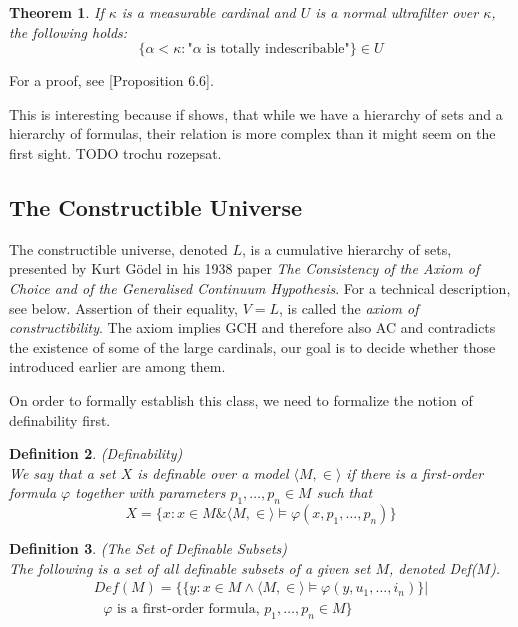 \documentclass[12pt,a4paper]{article}
\newtheorem{theorem}{Theorem}[section]
\newtheorem{definition}[theorem]{Definition}
\newcommand{\et}{\mathrel{\&}}
\begin{document}
\begin{theorem}
If $\kappa$ is a measurable cardinal and $U$ is a normal ultrafilter over $\kappa$, the following holds:
\begin{equation}
\{ \alpha < \kappa: \mbox{"$\alpha$ is totally indescribable"}\} \in U
\end{equation}
\end{theorem}
For a proof, see \cite{KanamoriBook}[Proposition 6.6].

This is interesting because if shows, that while we have a hierarchy of sets and a hierarchy of formulas, their relation is more complex than it might seem on the first sight. 
TODO trochu rozepsat.


\subsection{The Constructible Universe}

The constructible universe, denoted $L$, is a cumulative hierarchy of sets, presented by Kurt Gödel in his 1938 paper \emph{The Consistency of the Axiom of Choice and of the Generalised Continuum Hypothesis}. For a technical description, see below. Assertion of their equality, $V=L$, is called the \emph{axiom of constructibility}. The axiom implies GCH and therefore also AC and contradicts the existence of some of the large cardinals, our goal is to decide whether those introduced earlier are among them.

On order to formally establish this class, we need to formalize the notion of definability first. 
\begin{definition}{(Definability)}\label{def:definability}\\
We say that a set $X$ is \emph{definable} over a model $\langle M, \in \rangle$ if there is a first-order formula $\varphi$ together with parameters $p_1, \ldots, p_n \in M$ such that
\begin{equation}
X = \{x: x \in M \et \langle M, \in \rangle \models \varphi(x, p_1, \ldots, p_n)\}
\end{equation}
\end{definition}

\begin{definition}{(The Set of Definable Subsets)}\label{def:definable_powerset}\\
The following is a set of all definable subsets of a given set $M$, denoted Def($M$).
\begin{equation}
\begin{gathered}
Def(M) = \{\{y : x \in M \land \langle M, \in \rangle \models \varphi(y, u_1, \ldots, i_n) \} |\\
\mbox{ $\varphi$ is a~first-order formula, }p_1, \ldots, p_n \in M \}
\end{gathered}
\end{equation}
\end{definition}
\end{document}
